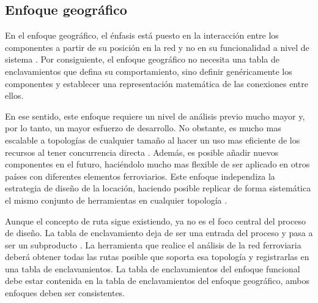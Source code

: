 \subsection{Enfoque geográfico}

    En el enfoque geográfico, el énfasis está puesto en la interacción entre los componentes a partir de su posición en la red y no en su funcionalidad a nivel de sistema \cite{Paper_101,Paper_102,Paper_103}. Por consiguiente, el enfoque geográfico no necesita una tabla de enclavamientos que defina su comportamiento, sino definir genéricamente los componentes y establecer una representación matemática de las conexiones entre ellos. 
    
    En ese sentido, este enfoque requiere un nivel de análisis previo mucho mayor y, por lo tanto, un mayor esfuerzo de desarrollo. No obstante, es mucho mas escalable a topologías de cualquier tamaño al hacer un uso mas eficiente de los recursos al tener concurrencia directa \cite{Paper_99,Paper_146,Paper_168}. Además, es posible añadir nuevos componentes en el futuro, haciéndolo mucho mas flexible de ser aplicado en otros países con diferentes elementos ferroviarios. Este enfoque independiza la estrategia de diseño de la locación, haciendo posible replicar de forma sistemática el mismo conjunto de herramientas en cualquier topología \cite{Paper_180,Paper_182,Paper_200}.

    Aunque el concepto de ruta sigue existiendo, ya no es el foco central del proceso de diseño. La tabla de enclavamiento deja de ser una entrada del proceso y pasa a ser un subproducto \cite{Paper_200}. La herramienta que realice el análisis de la red ferroviaria deberá obtener todas las rutas posible que soporta esa topología y registrarlas en una tabla de enclavamientos. La tabla de enclavamientos del enfoque funcional debe estar contenida en la tabla de enclavamientos del enfoque geográfico, ambos enfoques deben ser consistentes.